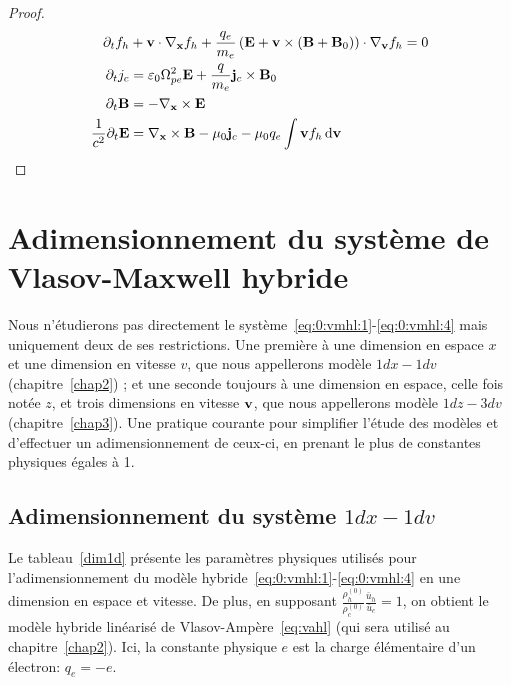\begin{proof}
  \begin{align}
      \partial_t f_h &+ \vb{v}\cdot\nabla_{\vb{x}} f_h + \frac{q_e}{m_e}\left( \vb{E} + \vb{v}\times(\vb{B}+\vb{B}_0) \right)\cdot\nabla_{\vb{v}} f_h = 0 \\
      \partial_t j_c &= \varepsilon_0\Omega_{pe}^2\vb{E} + \frac{q}{m_e}\vb{j}_c\times\vb{B}_0 \\
      \partial_t\vb{B} &= -\nabla_{\vb{x}}\times\vb{E} \\
      \frac{1}{c^2}\partial_t\vb{E} &= \nabla_{\vb{x}}\times\vb{B} - \mu_0\vb{j}_c - \mu_0q_e\int\vb{v}f_h\dd{\vb{v}}
  \end{align}
\end{proof}


\section{Adimensionnement du système de Vlasov-Maxwell hybride}
\label{sec:0:adim}

Nous n'étudierons pas directement le système~\eqref{eq:0:vmhl:1}-\eqref{eq:0:vmhl:4} mais uniquement deux de ses restrictions. Une première à une dimension en espace $x$ et une dimension en vitesse $v$, que nous appellerons modèle $1dx-1dv$ (chapitre~\ref{chap2}) ; et une seconde toujours à une dimension en espace, celle fois notée $z$, et trois dimensions en vitesse $\vb{v}$, que nous appellerons modèle $1dz-3dv$ (chapitre~\ref{chap3}). Une pratique courante pour simplifier l'étude des modèles et d'effectuer un adimensionnement de ceux-ci, en prenant le plus de constantes physiques égales à 1.

\subsection{Adimensionnement du système $1dx-1dv$}

Le tableau~\ref{dim1d} présente les paramètres physiques utilisés pour l'adimensionnement du modèle hybride~\eqref{eq:0:vmhl:1}-\eqref{eq:0:vmhl:4} en une dimension en espace et vitesse. De plus, en supposant $\frac{\rho_h^{(0)}}{\rho_c^{(0)}}\frac{\bar{u}_h}{\bar{u}_c} =1$, on obtient le modèle hybride linéarisé de Vlasov-Ampère~\eqref{eq:vahl} (qui sera utilisé au chapitre~\ref{chap2}). Ici, la constante physique $e$ est la charge élémentaire d'un électron: $q_e=-e$.

